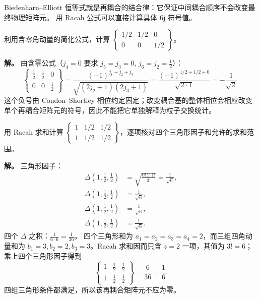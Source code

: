 \par\medskip
\par\medskip
Biedenharn--Elliott 恒等式就是再耦合的结合律：它保证中间耦合顺序不会改变最终物理矩阵元。
用 Racah 公式可以直接计算具体 6j 符号值。
\begin{example}[{最小半整数 6j 符号}]
利用含零角动量的简化公式，计算 $\left\{\begin{smallmatrix}1/2&1/2&0\\0&0&1/2\end{smallmatrix}\right\}$。

\textbf{解。} 由含零公式（$j_4=0$ 要求 $j_5=j_3=0$, $j_6=j_2=\frac12$）：
\[
\begin{Bmatrix}\tfrac12&\tfrac12&0\\0&0&\tfrac12\end{Bmatrix}
=\frac{(-1)^{j_1+j_2+j_3}}{\sqrt{(2j_2+1)(2j_3+1)}}
=\frac{(-1)^{1/2+1/2+0}}{\sqrt{2\cdot1}}
=-\frac{1}{\sqrt{2}}.
\]
这个负号由 Condon--Shortley 相位约定固定；改变耦合基的整体相位会相应改变单个再耦合矩阵元的符号，因此不能把它单独解释为粒子交换统计。
\end{example}
\begin{example}[{非零再耦合矩阵元}]
用 Racah 求和计算 $\left\{\begin{smallmatrix}1&1/2&1/2\\1&1/2&1/2\end{smallmatrix}\right\}$，逐项核对四个三角形因子和允许的求和范围。

\textbf{解。} 三角形因子：
\begin{align*}
\Delta(1,\tfrac12,\tfrac12)&=\sqrt{\frac{0!\,1!\,1!}{3!}}=\frac1{\sqrt6},\\
\Delta(1,\tfrac12,\tfrac12)&=\frac1{\sqrt6},\\
\Delta(1,\tfrac12,\tfrac12)&=\frac1{\sqrt6},\\
\Delta(1,\tfrac12,\tfrac12)&=\frac1{\sqrt6}.
\end{align*}
四个 $\Delta$ 之积：$\frac{1}{6\cdot6}=\frac{1}{36}$。
四个三角形和为 $a_1=a_2=a_3=a_4=2$，而三组四角动量和为
$b_1=3,b_2=2,b_3=3$。Racah 求和因而只含 $z=2$ 一项，其值为 $3!=6$；
乘上四个三角形因子得到
\[
\begin{Bmatrix}1&\frac12&\frac12\\1&\frac12&\frac12\end{Bmatrix}
=\frac{6}{36}=\frac16.
\]
四组三角形条件都满足，所以该再耦合矩阵元不应为零。
\end{example}
